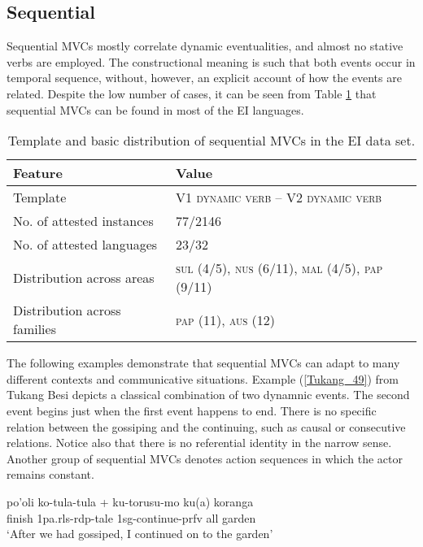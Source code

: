 \subsection{Sequential}

Sequential MVCs mostly correlate dynamic eventualities, and almost no stative verbs are employed. The constructional meaning is such that both events occur in temporal sequence, without, however, an explicit account of how the events are related. Despite the low number of cases, it can be seen from Table \ref{table:sequential} that sequential MVCs can be found in most of the EI languages.

\begin{table}


\begin{tabular}{ll}
\lsptoprule
Feature&Value\tabularnewline
\hline
Template& V1 \textsc{dynamic verb} -- V2 \textsc{dynamic verb}\tabularnewline
No. of attested instances& 77/2146 \tabularnewline
No. of attested languages& 23/32 \tabularnewline
Distribution across areas& \textsc{sul} (4/5), \textsc{nus} (6/11), \textsc{mal} (4/5), \textsc{pap} (9/11) \tabularnewline
Distribution across families& \textsc{pap} (11), \textsc{aus} (12) \tabularnewline
\hline
\end{tabular}
\caption[Template and basic distribution of sequential MVCs]{Template and basic distribution of sequential MVCs in the EI data set.}
\label{table:sequential}
\end{table}


The following examples demonstrate that sequential MVCs can adapt to many different contexts and communicative situations. Example (\ref{Tukang_49}) from Tukang Besi depicts a classical combination of two dynamnic events. The second event begins just when the first event happens to end. There is no specific relation between the gossiping and the continuing, such as causal or consecutive relations. Notice also that there is no referential identity in the narrow sense. Another group of sequential MVCs denotes action sequences in which the actor remains constant. 

\ea \label{Tukang_49}
\gll po'oli ko-tula-tula + ku-torusu-mo ku(a) koranga \\
finish 1\acs{pa}.\acs{rls}-\acs{rdp}-tale 1\acs{sg}-continue-\acs{prfv} \acs{all} garden \\
\glft `After we had gossiped, I continued on to the garden' \\ 
\z
\xe

